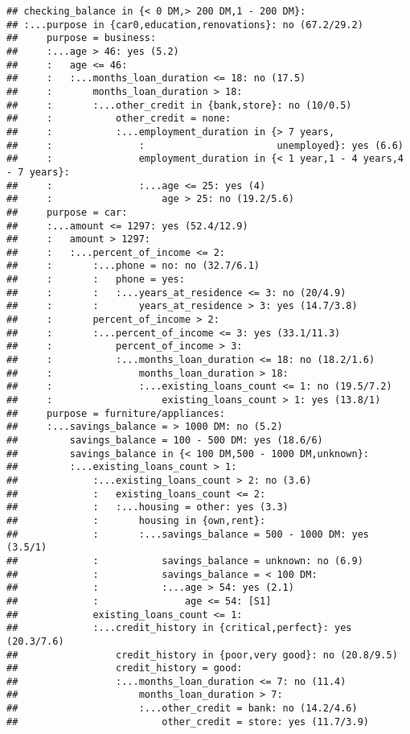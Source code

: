 \documentclass[
]{article}
\begin{document}
\begin{verbatim}
## checking_balance in {< 0 DM,> 200 DM,1 - 200 DM}:
## :...purpose in {car0,education,renovations}: no (67.2/29.2)
##     purpose = business:
##     :...age > 46: yes (5.2)
##     :   age <= 46:
##     :   :...months_loan_duration <= 18: no (17.5)
##     :       months_loan_duration > 18:
##     :       :...other_credit in {bank,store}: no (10/0.5)
##     :           other_credit = none:
##     :           :...employment_duration in {> 7 years,
##     :               :                       unemployed}: yes (6.6)
##     :               employment_duration in {< 1 year,1 - 4 years,4 - 7 years}:
##     :               :...age <= 25: yes (4)
##     :                   age > 25: no (19.2/5.6)
##     purpose = car:
##     :...amount <= 1297: yes (52.4/12.9)
##     :   amount > 1297:
##     :   :...percent_of_income <= 2:
##     :       :...phone = no: no (32.7/6.1)
##     :       :   phone = yes:
##     :       :   :...years_at_residence <= 3: no (20/4.9)
##     :       :       years_at_residence > 3: yes (14.7/3.8)
##     :       percent_of_income > 2:
##     :       :...percent_of_income <= 3: yes (33.1/11.3)
##     :           percent_of_income > 3:
##     :           :...months_loan_duration <= 18: no (18.2/1.6)
##     :               months_loan_duration > 18:
##     :               :...existing_loans_count <= 1: no (19.5/7.2)
##     :                   existing_loans_count > 1: yes (13.8/1)
##     purpose = furniture/appliances:
##     :...savings_balance = > 1000 DM: no (5.2)
##         savings_balance = 100 - 500 DM: yes (18.6/6)
##         savings_balance in {< 100 DM,500 - 1000 DM,unknown}:
##         :...existing_loans_count > 1:
##             :...existing_loans_count > 2: no (3.6)
##             :   existing_loans_count <= 2:
##             :   :...housing = other: yes (3.3)
##             :       housing in {own,rent}:
##             :       :...savings_balance = 500 - 1000 DM: yes (3.5/1)
##             :           savings_balance = unknown: no (6.9)
##             :           savings_balance = < 100 DM:
##             :           :...age > 54: yes (2.1)
##             :               age <= 54: [S1]
##             existing_loans_count <= 1:
##             :...credit_history in {critical,perfect}: yes (20.3/7.6)
##                 credit_history in {poor,very good}: no (20.8/9.5)
##                 credit_history = good:
##                 :...months_loan_duration <= 7: no (11.4)
##                     months_loan_duration > 7:
##                     :...other_credit = bank: no (14.2/4.6)
##                         other_credit = store: yes (11.7/3.9)

\end{verbatim}
\end{document}
